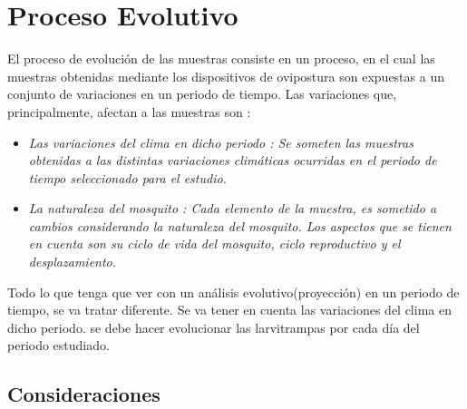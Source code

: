 \section{Proceso Evolutivo}
\label{sec:solucion-evolutivo}

El proceso de evolución de las muestras consiste en un proceso, en el cual las muestras obtenidas mediante los dispositivos de ovipostura  son expuestas a un conjunto de variaciones en un periodo de tiempo. Las variaciones que, principalmente, afectan a las muestras son :

\begin{itemize}
    \item \em Las variaciones del clima en dicho periodo \rm: Se someten las muestras obtenidas a las distintas variaciones climáticas ocurridas en el periodo de tiempo seleccionado para el estudio.
    \item \em La naturaleza del mosquito \rm: Cada elemento de la muestra, es sometido a cambios considerando la naturaleza del mosquito. Los aspectos que se tienen en cuenta son su ciclo de vida del mosquito, ciclo reproductivo y el desplazamiento.
\end{itemize}

Todo lo que tenga que ver con un análisis evolutivo(proyección) en un periodo de tiempo, se va tratar diferente. Se va tener en cuenta las variaciones del clima en dicho periodo. se debe hacer evolucionar las larvitrampas por cada día del periodo estudiado.

\subsection{Consideraciones}

